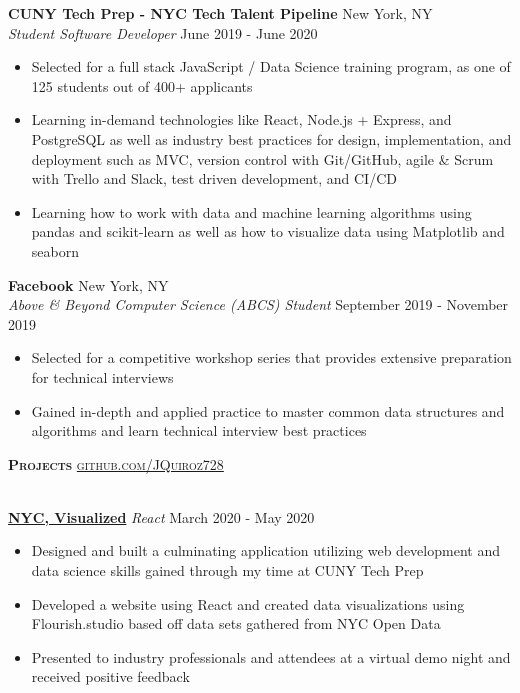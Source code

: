 \documentclass[a4paper]{article}
\newcommand{\lineunder} {
    \vspace*{-8pt} \\
    \hspace*{-18pt} \hrulefill \\
}
\newcommand{\header} [1] {
    {\hspace*{-18pt}\vspace*{6pt} \textsc{#1}}
    \vspace*{-6pt} \lineunder
}
\begin{document}
\textbf{CUNY Tech Prep - NYC Tech Talent Pipeline} \hfill New York, NY\\
\textit{Student Software Developer} \hfill June 2019 - June 2020\\
\vspace{-3mm}
\begin{itemize} \itemsep -2pt
	\item Selected for a full stack JavaScript / Data Science training program, as one of 125 students out of 400+ applicants
	\item Learning in-demand technologies like React, Node.js + Express, and PostgreSQL as well as industry best practices for design, implementation, and deployment such as MVC, version control with Git/GitHub, agile \& Scrum with Trello and Slack, test driven development, and CI/CD
    \item Learning how to work with data and machine learning algorithms using pandas and scikit-learn as well as how to visualize data using Matplotlib and seaborn
\end{itemize}
\textbf{Facebook} \hfill New York, NY\\
\textit{Above \& Beyond Computer Science (ABCS) Student} \hfill September 2019 - November 2019\\
\vspace{-3mm}
\begin{itemize} \itemsep -2pt
	\item Selected for a competitive workshop series that provides extensive preparation for technical interviews
	\item Gained in-depth and applied practice to master common data structures and algorithms and learn technical interview best practices
\end{itemize}


\header{\textbf{Projects} \hfill \href{https://github.com/JQuiroz728}{github.com/JQuiroz728}}
\vspace{1mm}

{\textbf{\href{https://boring-snyder-ca2ec9.netlify.app/}{NYC, Visualized}}} {\sl React} \hfill March 2020 - May 2020\\
\vspace{-3mm}
\begin{itemize} \itemsep -2pt
	\item Designed and built a culminating application utilizing web development and data science skills gained through my time at CUNY Tech Prep
    \item Developed a website using React and created data visualizations using Flourish.studio based off data sets gathered from NYC Open Data
    \item Presented to industry professionals and attendees at a virtual demo night and received positive feedback
    
    \end{itemize}
\end{document}
